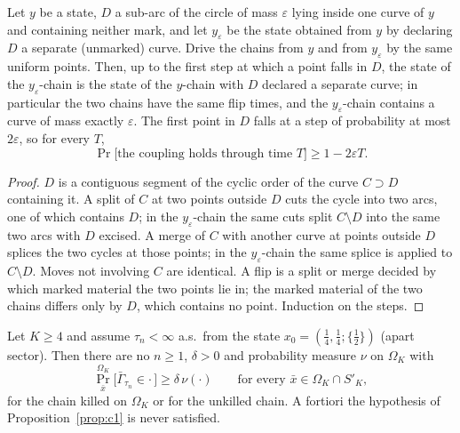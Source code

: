 \begin{lemma}\label{lem:inert}
Let $y$ be a state, $D$ a sub-arc of the circle of mass $\varepsilon$
lying inside one curve of $y$ and containing neither mark, and let
$y_\varepsilon$ be the state obtained from $y$ by declaring $D$ a
separate (unmarked) curve.  Drive the chains from $y$ and from
$y_\varepsilon$ by the same uniform points.  Then, up to the first step
at which a point falls in $D$, the state of the $y_\varepsilon$-chain
is the state of the $y$-chain with $D$ declared a separate curve; in
particular the two chains have the same flip times, and the
$y_\varepsilon$-chain contains a curve of mass exactly $\varepsilon$.
The first point in $D$ falls at a step of probability at most
$2\varepsilon$, so for every $T$,
\[
\Pr\bigl[\text{the coupling holds through time }T\bigr]\ge1-2\varepsilon T .
\]
\end{lemma}

\begin{proof}
$D$ is a contiguous segment of the cyclic order of the curve $C\supset D$
containing it.  A split of $C$ at two points outside $D$ cuts the cycle
into two arcs, one of which contains $D$; in the $y_\varepsilon$-chain
the same cuts split $C\setminus D$ into the same two arcs with $D$
excised.  A merge of $C$ with another curve at points outside $D$
splices the two cycles at those points; in the $y_\varepsilon$-chain the
same splice is applied to $C\setminus D$.  Moves not involving $C$ are
identical.  A flip is a split or merge decided by which marked material
the two points lie in; the marked material of the two chains differs
only by $D$, which contains no point.  Induction on the steps.
\end{proof}

\begin{proposition}\label{prop:nomino}
Let $K\ge4$ and assume $\tau_n<\infty$ a.s.\ from the state
$x_0=(\tfrac14,\tfrac14;\{\tfrac12\})$ (apart sector).  Then there are
no $n\ge1$, $\delta>0$ and probability measure $\nu$ on $\Omega_K$ with
\[
\Pr^{\Omega_K}_{\bar x}\bigl[\bar\Gamma_{\tau_n}\in\cdot\,\bigr]\ge\delta\,\nu(\cdot)
\qquad\text{for every }\bar x\in\Omega_K\cap S'_K ,
\]
for the chain killed on $\Omega_K$ or for the unkilled chain.  A
fortiori the hypothesis of Proposition~\ref{prop:c1} is never
satisfied.
\end{proposition}

